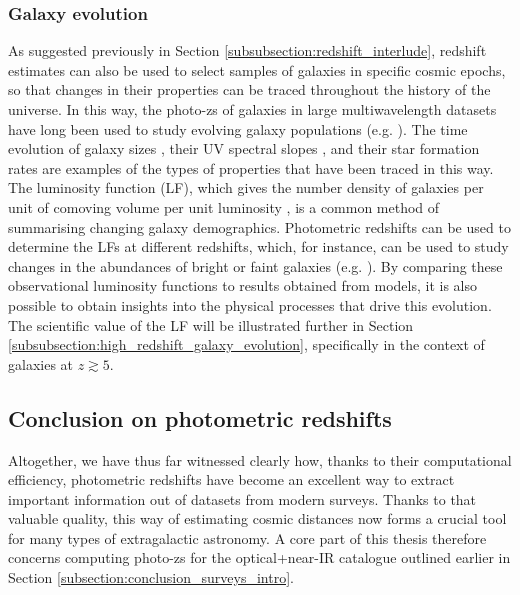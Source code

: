 \subsubsection{Galaxy evolution}\label{subsubsection:photoz_galaxy_evolution}
As suggested previously in Section \ref{subsubsection:redshift_interlude}, redshift estimates can also be used to select samples of galaxies in specific cosmic epochs, so that changes in their properties can be traced throughout the history of the universe. In this way, the photo-zs of galaxies in large multiwavelength datasets have long been used to study evolving galaxy populations (e.g. \citealt{2000AJ....120.2206F,2012ApJ...756..164F,2014ApJ...792...76B}). The time evolution of galaxy sizes \citep{2000ApJ...530L..73G}, their UV spectral slopes \citep{2012ApJ...756..164F},  and their star formation rates \citep{2007ApJ...670..156D, 2013A&A...556A..55I} are examples of the types of properties that have been traced in this way.  The luminosity function (LF), which gives the number density of galaxies per unit of comoving volume per unit luminosity \citep{2013ASSL..396..223D}, is a common method of summarising changing galaxy demographics. Photometric redshifts can be used to determine the LFs at different redshifts, which, for instance, can be used to study changes in the abundances of bright or faint galaxies (e.g. \citealt{2003ApJ...593L...1P,2011AJ....142...41R,2010MNRAS.403..960M}). By comparing these observational luminosity functions to results obtained from models, it is also possible to obtain insights into the physical processes that drive this evolution. The scientific value of the LF will be illustrated further in Section \ref{subsubsection:high_redshift_galaxy_evolution}, specifically in the context of galaxies at $z\gtrsim5$. \par 



\subsection{Conclusion on photometric redshifts}\label{subsection:conclusion_photoz_intro}
Altogether, we have thus far witnessed clearly how, thanks to their computational efficiency, photometric redshifts have become an excellent way to extract important information out of datasets from modern surveys. Thanks to that valuable quality, this way of estimating cosmic distances now forms a crucial tool for many types of extragalactic astronomy. A core part of this thesis therefore concerns computing photo-zs for the optical+near-IR catalogue outlined earlier in Section \ref{subsection:conclusion_surveys_intro}. \par 


